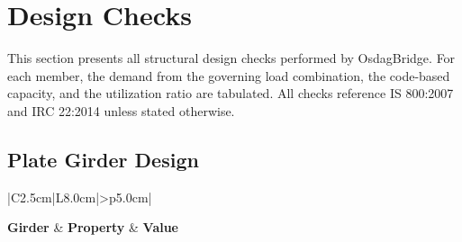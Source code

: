 \documentclass[12pt,a4paper]{report}
\numberwithin{table}{chapter}
\numberwithin{figure}{chapter}
\begin{document}
\chapter{Design Checks}

This section presents all structural design checks performed by OsdagBridge. For each member, the demand from the governing load combination, the code-based capacity, and the utilization ratio are tabulated. All checks reference IS 800:2007 and IRC 22:2014 unless stated otherwise.

\section{Plate Girder Design}
\label{sec:plate-girder}

\vspace{1em}
\begin{longtable}{|C{2.5cm}|L{8.0cm}|>{\centering\arraybackslash}p{5.0cm}|}
\caption{\textbf{Girder Section Properties (Final Optimized / User-selected)}}
\hline
\textbf{Girder} & \textbf{Property} & \textbf{Value} \\[6pt]
\hline


\end{longtable}
\end{document}
